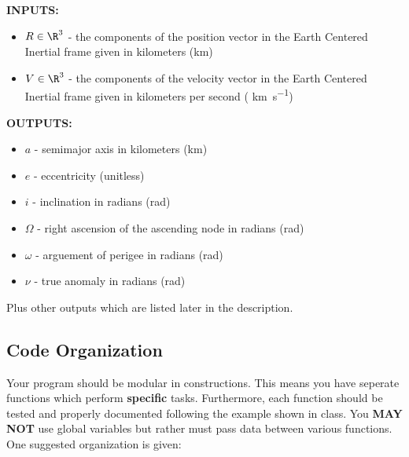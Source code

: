 \documentclass[11pt, reqno]{article}    %
\begin{document}
\noindent \textbf{INPUTS:}
\begin{itemize}
    \item \( R \in \R^{3} \) - the components of the position vector in the Earth Centered Inertial frame given in kilometers (\si{\kilo\meter})
    \item \( V \in \R^{3} \) - the components of the velocity vector in the Earth Centered Inertial frame given in kilometers per second ( \si{\kilo\meter\per\second})
\end{itemize}

\noindent \textbf{OUTPUTS:}
\begin{itemize}
    \item \( a \)  - semimajor axis in kilometers (\si{\kilo\meter})
    \item \( e \) - eccentricity (unitless)
    \item \( i \) - inclination in radians (\si{\radian})
    \item \( \Omega \) - right ascension of the ascending node in radians (\si{\radian})
    \item \( \omega \) - arguement of perigee in radians (\si{\radian})
    \item \( \nu \) - true anomaly in radians (\si{\radian})
\end{itemize}
Plus other outputs which are listed later in the description.

\subsection*{Code Organization} 
Your program should be modular in constructions. 
This means you have seperate functions which perform \textbf{specific} tasks.
Furthermore, each function should be tested and properly documented following the example shown in class.
You \textbf{MAY NOT}  use global variables but rather must pass data between various functions.
One suggested organization is given:

\end{document}
